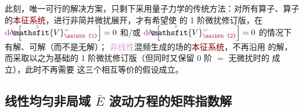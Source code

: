 此刻，唯一可行的解决方案，只剩下采用量子力学的传统方法：对所有算子、算子的\textcolor{Maroon}{本征系统}，进行\textcolor{NavyBlue}{非简并微扰展开}，才有希望使 {\one}  的 \textcolor{NavyBlue}{1 阶微扰}修订版，在 $\textcolor{Plum}{\det} \left[ \Xint{\mathcolor{gray}{-}}{25}{\bar{\bar{\mathsfit{V}}}}^{\;\! \mathcolor{gray}{\omega}}_{\textcolor{Maroon}{\mathbb{1}}} \right] = 0$ 和/或 $\textcolor{Plum}{\det} \left[ \Xint{\mathcolor{gray}{-}}{25}{\bar{\bar{\mathsfit{V}}}}^{\;\! \mathcolor{gray}{\omega}}_{\textcolor{Maroon}{\mathbb{2}}} \right] = 0$ 的情况下有解、可解（而不是无解）；{\two} \textcolor{Plum}{非线性}混频生成的场的\textcolor{Maroon}{本征系统}，不再沿用  的解，而采取以之为基础的 \textcolor{NavyBlue}{1 阶微扰}修订版（但同时又保留 \textcolor{NavyBlue}{0 阶} $=$ \textcolor{NavyBlue}{无微扰}时的  成立），此时不再需要  这三个相互等价的假设成立。

\clearpage
\vspace*{-7.5em}


\subsection{线性均匀非局域 $\bar{E}$ 波动方程的矩阵指数解}\label{ssec:Exp-solution-linear}

